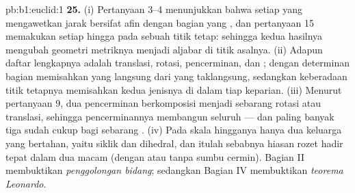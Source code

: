 \begin{solution}{pb:b1:euclid:1}
\textbf{25.} (i) Pertanyaan 3--4 menunjukkan bahwa setiap 
yang mengawetkan jarak bersifat afin dengan bagian  yang , dan pertanyaan 15 memakukan
setiap  hingga pada sebuah titik tetap: sehingga kedua hasilnya mengubah
geometri metriknya menjadi aljabar  di titik asalnya. (ii) Adapun
daftar lengkapnya adalah translasi, rotasi, pencerminan, dan ; dengan determinan bagian  memisahkan yang langsung
dari yang taklangsung, sedangkan keberadaan titik tetapnya memisahkan
kedua jenisnya di dalam tiap keparian. (iii) Menurut pertanyaan 9, dua
pencerminan berkomposisi menjadi sebarang rotasi atau translasi, sehingga
pencerminannya membangun seluruh  --- dan paling banyak tiga sudah cukup
bagi sebarang . (iv) Pada skala hingganya hanya dua keluarga
yang bertahan, yaitu  siklik dan dihedral, dan itulah sebabnya hiasan
rozet hadir tepat dalam dua macam (dengan atau tanpa sumbu
cermin). Bagian II membuktikan \emph{penggolongan 
bidang}; sedangkan Bagian IV membuktikan \emph{teorema Leonardo}.

\end{solution}
